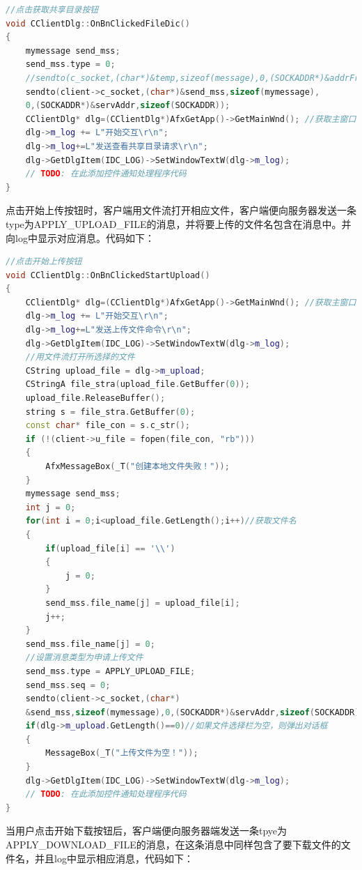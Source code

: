 \begin{flushleft}
\begin{lstlisting}[language={C++},basicstyle=\footnotesize]
//点击获取共享目录按钮
void CClientDlg::OnBnClickedFileDic()
{
	mymessage send_mss;
	send_mss.type = 0;
	//sendto(c_socket,(char*)&temp,sizeof(message),0,(SOCKADDR*)&addrFrom,len);
	sendto(client->c_socket,(char*)&send_mss,sizeof(mymessage),
    0,(SOCKADDR*)&servAddr,sizeof(SOCKADDR));
	CClientDlg* dlg=(CClientDlg*)AfxGetApp()->GetMainWnd(); //获取主窗口
	dlg->m_log += L"开始交互\r\n";
	dlg->m_log+=L"发送查看共享目录请求\r\n";
	dlg->GetDlgItem(IDC_LOG)->SetWindowTextW(dlg->m_log);
	// TODO: 在此添加控件通知处理程序代码
}
\end{lstlisting}
\end{flushleft}

点击开始上传按钮时，客户端用文件流打开相应文件，客户端便向服务器发送一条type为APPLY\_UPLOAD\_FILE的消息，并将要上传的文件名包含在消息中。并向log中显示对应消息。代码如下：

\begin{flushleft}
\begin{lstlisting}[language={C++},basicstyle=\footnotesize]
//点击开始上传按钮
void CClientDlg::OnBnClickedStartUpload()
{
	CClientDlg* dlg=(CClientDlg*)AfxGetApp()->GetMainWnd(); //获取主窗口
	dlg->m_log += L"开始交互\r\n";
	dlg->m_log+=L"发送上传文件命令\r\n";
	dlg->GetDlgItem(IDC_LOG)->SetWindowTextW(dlg->m_log);
	//用文件流打开所选择的文件
	CString upload_file = dlg->m_upload;
	CStringA file_stra(upload_file.GetBuffer(0));
	upload_file.ReleaseBuffer();
	string s = file_stra.GetBuffer(0);
	const char* file_con = s.c_str();
	if (!(client->u_file = fopen(file_con, "rb")))
	{
		AfxMessageBox(_T("创建本地文件失败！"));
	}
	mymessage send_mss;
	int j = 0;
	for(int i = 0;i<upload_file.GetLength();i++)//获取文件名
	{
		if(upload_file[i] == '\\')
		{
			j = 0;
		}
		send_mss.file_name[j] = upload_file[i];
		j++;
	}
	send_mss.file_name[j] = 0;
	//设置消息类型为申请上传文件
	send_mss.type = APPLY_UPLOAD_FILE;
	send_mss.seq = 0;
	sendto(client->c_socket,(char*)
    &send_mss,sizeof(mymessage),0,(SOCKADDR*)&servAddr,sizeof(SOCKADDR));
	if(dlg->m_upload.GetLength()==0)//如果文件选择栏为空，则弹出对话框
	{
		MessageBox(_T("上传文件为空！"));
	}
	dlg->GetDlgItem(IDC_LOG)->SetWindowTextW(dlg->m_log);
	// TODO: 在此添加控件通知处理程序代码
}
\end{lstlisting}
\end{flushleft}

当用户点击开始下载按钮后，客户端便向服务器端发送一条tpye为APPLY\_DOWNLOAD\_FILE的消息，在这条消息中同样包含了要下载文件的文件名，并且log中显示相应消息，代码如下：

